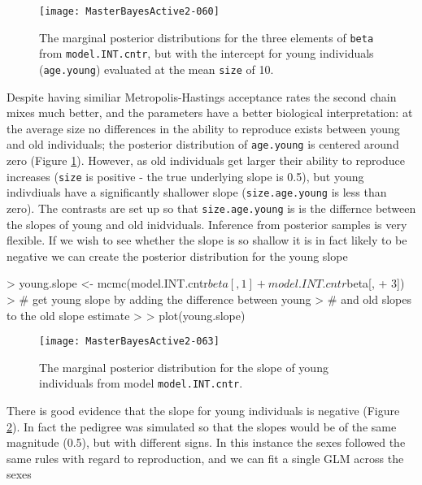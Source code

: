 \documentclass{article}
\begin{document}
\begin{figure}[!h]
\begin{center}
\texttt{[image: MasterBayesActive2-060]}
\end{center}
\caption{The marginal posterior distributions for the three elements of \texttt{beta} from \texttt{model.INT.cntr}, but with the intercept for young individuals (\texttt{age.young}) evaluated at the mean \texttt{size} of 10.  }
\label{INT.cntr-fig}
\end{figure}

Despite having similiar Metropolis-Hastings acceptance rates the second chain mixes much better, and the parameters have a better biological interpretation: at the average size no differences in the ability to reproduce exists between young and old individuals;  the posterior distribution of \texttt{age.young} is centered around zero (Figure \ref{INT.cntr-fig}).  However, as old individuals get larger their ability to reproduce increases (\texttt{size} is positive - the true underlying slope is 0.5), but young indivdiuals have a significantly shallower slope (\texttt{size.age.young} is less than zero).  The contrasts are set up so that \texttt{size.age.young} is is the differnce between the slopes of young and old inidviduals.  Inference from posterior samples is very flexible.  If we wish to see whether the slope is so shallow it is in fact likely to be negative we can create the posterior distribution for the young slope

\begin{Schunk}
\begin{Sinput}
> young.slope <- mcmc(model.INT.cntr$beta[, 1] + model.INT.cntr$beta[, 
+     3])
> # get young slope by adding the difference between young
> # and old slopes to the old slope estimate
>  
> plot(young.slope)
\end{Sinput}
\end{Schunk}


\begin{figure}[!h]
\begin{center}
\texttt{[image: MasterBayesActive2-063]}
\end{center}
\caption{The marginal posterior distribution for the slope of young individuals from model \texttt{model.INT.cntr}.}
\label{ys-fig}
\end{figure}

There is good evidence that the slope for young individuals is negative (Figure \ref{ys-fig}).  In fact the pedigree was simulated so that the slopes would be of the same magnitude (0.5), but with different signs. In this instance the sexes followed the same rules with regard to reproduction, and we can fit a single GLM across the sexes
\end{document}
